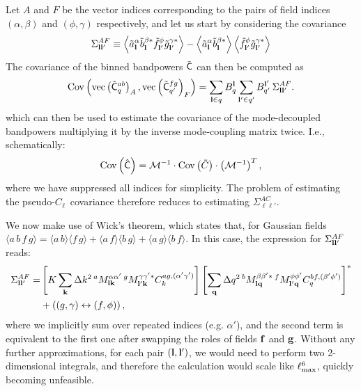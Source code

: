 \documentclass[a4paper,11pt]{article}
\newcommand{\PCL}{pseudo-$C_\ell$~}
\newcommand{\summ}[1]{\sum_{\bf #1}\Delta #1^2}
\begin{document}
      Let $A$ and $F$ be the vector indices corresponding to the pairs of field indices $(\alpha,\beta)$ and $(\phi,\gamma)$ respectively, and let us start by considering the covariance
      \begin{equation}
        \Sigma^{AF}_{{\bf l}{\bf l}'}\equiv\left\langle\tilde{a}^\alpha_{\bf l}\tilde{b}^{\beta *}_{\bf l}\tilde{f}^\phi_{{\bf l}'}\tilde{g}^{\gamma *}_{{\bf l}'}\right\rangle-\left\langle\tilde{a}^\alpha_{\bf l}\tilde{b}^{\beta *}_{\bf l}\right\rangle\left\langle\tilde{f}^\phi_{{\bf l}'}\tilde{g}^{\gamma *}_{{\bf l}'}\right\rangle
      \end{equation}
      The covariance of the binned bandpowers $\tilde{\sf C}$ can then be computed as
      \begin{equation}\label{eq:cov_binned}
        {\rm Cov}\left({\rm vec}\left(\tilde{\sf C}^{ab}_q\right)_A,{\rm vec}\left(\tilde{\sf C}^{fg}_{q'}\right)_F\right)=\sum_{{\bf l}\in q} B^{\bf l}_q\sum_{{\bf l}'\in q'} B^{{\bf l}'}_{q'}\,\Sigma^{AF}_{{\bf l}{\bf l}'}.
      \end{equation}
      which can then be used to estimate the covariance of the mode-decoupled bandpowers multiplying it by the inverse mode-coupling matrix twice. I.e., schematically:
      \begin{equation}
        {\rm Cov}\left(\hat{\sf C}\right)=\mathcal{M}^{-1}\cdot{\rm Cov}\left(\tilde{C}\right)\cdot\left(\mathcal{M}^{-1}\right)^{T},
      \end{equation}
      where we have suppressed all indices for simplicity. The problem of estimating the \PCL covariance therefore reduces to estimating $\Sigma^{AC}_{\ell\ell'}$.
    
      We now make use of Wick's theorem, which states that, for Gaussian fields $\langle a\,b\,f\,g\rangle=\langle a\,b\rangle\langle f\,g\rangle+\langle a\,f\rangle\langle b\,g\rangle+\langle a\,g\rangle\langle b\,f\rangle$. In this case, the expression for $\Sigma^{AF}_{{\bf l}{\bf l'}}$ reads:
      \begin{align}\nonumber
        \Sigma^{AF}_{{\bf l}{\bf l}'}=&\left[K\summ{k}\,^aM^{\alpha\alpha'}_{{\bf l}{\bf k}}\,^gM^{\gamma\gamma'*}_{{\bf l}'{\bf k}}C^{ag,(\alpha'\gamma')}_k\right]\left[\summ{q}\,^bM^{\beta\beta'*}_{{\bf l}{\bf q}}\,^fM^{\phi\phi'}_{{\bf l}'{\bf q}}C^{bf,(\beta'\phi')}_q\right]^*\\\label{eq:covar_general}
        &+\left((g,\gamma)\leftrightarrow(f,\phi)\right),
      \end{align}
      where we implicitly sum over repeated indices (e.g. $\alpha'$), and the second term is equivalent to the first one after swapping the roles of fields ${\bf f}$ and ${\bf g}$. Without any further approximations, for each pair $({\bf l},{\bf l}')$, we would need to perform two 2-dimensional integrals, and therefore the calculation would scale like $\ell_{\rm max}^6$, quickly becoming unfeasible.
    
\end{document}
